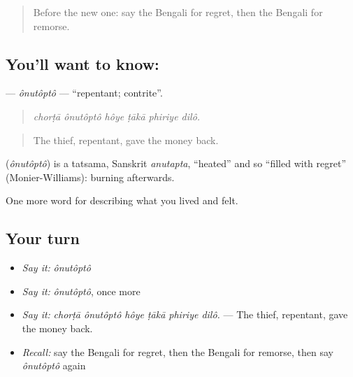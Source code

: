 \label{lesson:BN-C447-onutopto}



\begin{quote}
Before the new one: say the Bengali for regret, then the Bengali for remorse.
\end{quote}

\subsection*{You'll want to know: }
\textbf{} — \emph{ônutôptô} — \textquotedblleft{}repentant; contrite\textquotedblright{}.

\begin{quote}
     
\end{quote}

\begin{quote}
\emph{chorṭā ônutôptô hôye ṭākā phiriye dilô.}
\end{quote}

\begin{quote}
The thief, repentant, gave the money back.
\end{quote}

\begin{cousinweb}
\textbf{} (\emph{ônutôptô}) is a tatsama, Sanskrit \emph{anutapta}, \textquotedblleft{}heated\textquotedblright{} and so \textquotedblleft{}filled with regret\textquotedblright{} (Monier-Williams): burning afterwards.
\end{cousinweb}

\begin{grammarlens}[title={What you've built}]
One more word for describing what you lived and felt.
\end{grammarlens}

\subsection*{Your turn}
\begin{itemize}
\raggedright
  \item \emph{Say it:} \emph{ônutôptô}
  \item \emph{Say it:} \emph{ônutôptô}, once more
  \item \emph{Say it:} \emph{chorṭā ônutôptô hôye ṭākā phiriye dilô.} — The thief, repentant, gave the money back.
  \item \emph{Recall:} say the Bengali for regret, then the Bengali for remorse, then say \emph{ônutôptô} again
\end{itemize}

